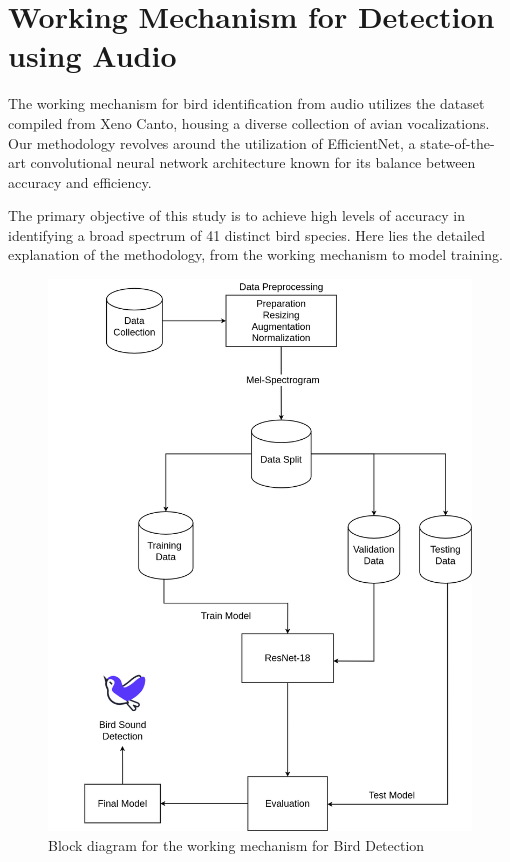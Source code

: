 \section{Working Mechanism for Detection using Audio}
The working mechanism for bird identification from audio utilizes the dataset compiled from Xeno Canto, housing a diverse collection of avian vocalizations. 
Our methodology revolves around the utilization of EfficientNet, a state-of-the-art convolutional neural network architecture known for 
its balance between accuracy and efficiency.

The primary objective of this study is to achieve high levels of accuracy in identifying a broad spectrum of 41 distinct bird species. 
Here lies the detailed explanation of the methodology, from the working mechanism to model training.
\begin{figure}[h!]
    \centering
    \includegraphics[scale=0.33]{images/DetectionMethodology.png}
    \caption{Block diagram for the working mechanism for Bird Detection}%
\end{figure}


